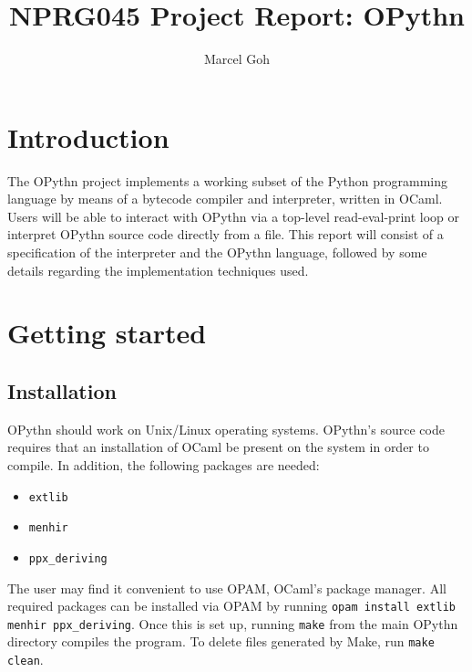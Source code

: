 \documentclass[11pt, twoside]{article}
\newcommand{\ms}{\texttt}
\begin{document}
\title{\Huge{\textbf{NPRG045 Project Report: OPythn}}}
\author{\Large{Marcel Goh}}
\clearpage\maketitle
\thispagestyle{empty}
\newpage
\setcounter{page}{1}

\section{Introduction}
    The OPythn project implements a working subset of the Python programming language by means of a bytecode compiler and interpreter, written in OCaml. Users will be able to interact with OPythn via a top-level read-eval-print loop or interpret OPythn source code directly from a file. This report will consist of a specification of the interpreter and the OPythn language, followed by some details regarding the implementation techniques used.

\section{Getting started}
    \subsection{Installation}
    OPythn should work on Unix/Linux operating systems. OPythn's source code requires that an installation of OCaml be present on the system in order to compile. In addition, the following packages are needed:
    \begin{itemize}
        \item \ms{extlib}
        \item \ms{menhir}
        \item \ms{ppx\_deriving}
    \end{itemize}
    The user may find it convenient to use OPAM, OCaml's package manager. All required packages can be installed via OPAM by running \ms{opam install extlib menhir ppx\_deriving}. Once this is set up, running \ms{make} from the main OPythn directory compiles the program. To delete files generated by Make, run \ms{make clean}.
\end{document}
